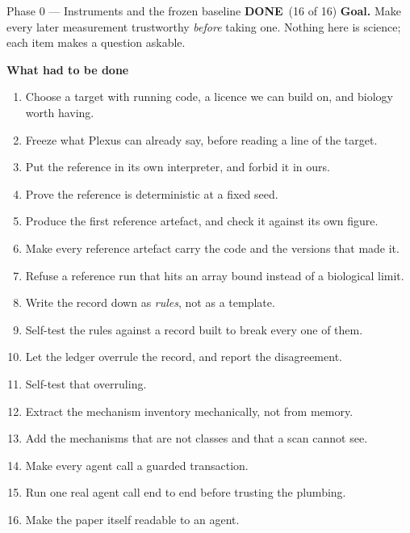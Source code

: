 \documentclass[11pt,a4paper]{article}
\newcommand{\done}{\textcolor{good}{\textbf{DONE}}}
\begin{document}
\begin{phasebox}{Phase 0 --- Instruments and the frozen baseline \hfill \done\ (16 of 16)}
\textbf{Goal.} Make every later measurement trustworthy \emph{before} taking one. Nothing here is
science; each item makes a question askable.

\textbf{What had to be done}
\begin{enumerate}[leftmargin=1.5em,itemsep=1pt]
\item Choose a target with running code, a licence we can build on, and biology worth having.
\item Freeze what Plexus can already say, before reading a line of the target.
\item Put the reference in its own interpreter, and forbid it in ours.
\item Prove the reference is deterministic at a fixed seed.
\item Produce the first reference artefact, and check it against its own figure.
\item Make every reference artefact carry the code and the versions that made it.
\item Refuse a reference run that hits an array bound instead of a biological limit.
\item Write the record down as \emph{rules}, not as a template.
\item Self-test the rules against a record built to break every one of them.
\item Let the ledger overrule the record, and report the disagreement.
\item Self-test that overruling.
\item Extract the mechanism inventory mechanically, not from memory.
\item Add the mechanisms that are not classes and that a scan cannot see.
\item Make every agent call a guarded transaction.
\item Run one real agent call end to end before trusting the plumbing.
\item Make the paper itself readable to an agent.
\end{enumerate}
\end{phasebox}
\end{document}
